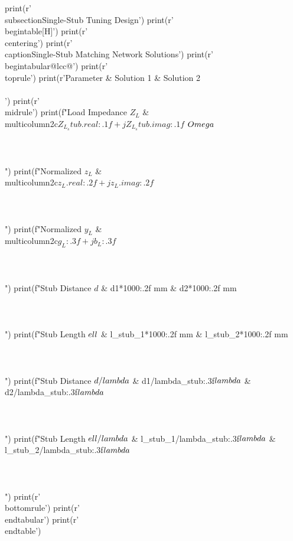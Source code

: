 \documentclass[11pt,a4paper]{article}
\begin{document}
\begin{pycode}
print(r'\\subsection{Single-Stub Tuning Design}')
print(r'\\begin{table}[H]')
print(r'\\centering')
print(r'\\caption{Single-Stub Matching Network Solutions}')
print(r'\\begin{tabular}{@{}lcc@{}}')
print(r'\\toprule')
print(r'Parameter & Solution 1 & Solution 2 \\\\')
print(r'\\midrule')
print(f"Load Impedance $Z_L$ & \\multicolumn{{2}}{{c}}{{${Z_L_stub.real:.1f} + j{Z_L_stub.imag:.1f}$ $\\Omega$}} \\\\\\\\")
print(f"Normalized $z_L$ & \\multicolumn{{2}}{{c}}{{${z_L.real:.2f} + j{z_L.imag:.2f}$}} \\\\\\\\")
print(f"Normalized $y_L$ & \\multicolumn{{2}}{{c}}{{${g_L:.3f} + j{b_L:.3f}$}} \\\\\\\\")
print(f"Stub Distance $d$ & {d1*1000:.2f} mm & {d2*1000:.2f} mm \\\\\\\\")
print(f"Stub Length $\\ell$ & {l_stub_1*1000:.2f} mm & {l_stub_2*1000:.2f} mm \\\\\\\\")
print(f"Stub Distance $d/\\lambda$ & {d1/lambda_stub:.3f}$\\lambda$ & {d2/lambda_stub:.3f}$\\lambda$ \\\\\\\\")
print(f"Stub Length $\\ell/\\lambda$ & {l_stub_1/lambda_stub:.3f}$\\lambda$ & {l_stub_2/lambda_stub:.3f}$\\lambda$ \\\\\\\\")
print(r'\\bottomrule')
print(r'\\end{tabular}')
print(r'\\end{table}')
\end{pycode}
\end{document}
